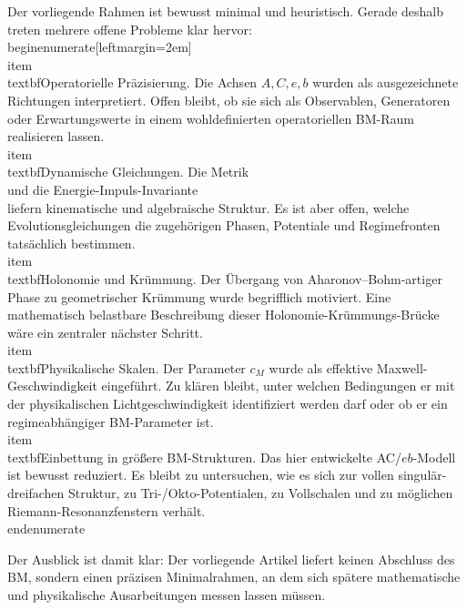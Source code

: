 \documentclass[11pt,a4paper]{article}
\theoremstyle{definition}
\theoremstyle{plain}
\begin{document}
	Der vorliegende Rahmen ist bewusst minimal und heuristisch. Gerade deshalb treten mehrere offene Probleme klar hervor:
	\\begin{enumerate}[leftmargin=2em]
	\\item \\textbf{Operatorielle Präzisierung.} Die Achsen $A,C,e,b$ wurden als ausgezeichnete Richtungen interpretiert. Offen bleibt, ob sie sich als Observablen, Generatoren oder Erwartungswerte in einem wohldefinierten operatoriellen BM-Raum realisieren lassen.
	\\item \\textbf{Dynamische Gleichungen.} Die Metrik
	\\[
	ds^2 = c_M^2\\, dA^2 - dC^2
	\\]
	und die Energie-Impuls-Invariante
	\\[
	e^2 - c_M^2 b^2 = m_{\\mathrm{BM}}^2 c_M^4
	\\]
	liefern kinematische und algebraische Struktur. Es ist aber offen, welche Evolutionsgleichungen die zugehörigen Phasen, Potentiale und Regimefronten tatsächlich bestimmen.
	\\item \\textbf{Holonomie und Krümmung.} Der Übergang von Aharonov--Bohm-artiger Phase zu geometrischer Krümmung wurde begrifflich motiviert. Eine mathematisch belastbare Beschreibung dieser Holonomie-Krümmungs-Brücke wäre ein zentraler nächster Schritt.
	\\item \\textbf{Physikalische Skalen.} Der Parameter $c_M$ wurde als effektive Maxwell-Geschwindigkeit eingeführt. Zu klären bleibt, unter welchen Bedingungen er mit der physikalischen Lichtgeschwindigkeit identifiziert werden darf oder ob er ein regimeabhängiger BM-Parameter ist.
	\\item \\textbf{Einbettung in größere BM-Strukturen.} Das hier entwickelte AC/$e b$-Modell ist bewusst reduziert. Es bleibt zu untersuchen, wie es sich zur vollen singulär-dreifachen Struktur, zu Tri-/Okto-Potentialen, zu Vollschalen und zu möglichen Riemann-Resonanzfenstern verhält.
	\\end{enumerate}
	
	Der Ausblick ist damit klar: Der vorliegende Artikel liefert keinen Abschluss des BM, sondern einen präzisen Minimalrahmen, an dem sich spätere mathematische und physikalische Ausarbeitungen messen lassen müssen.
	
\end{document}
